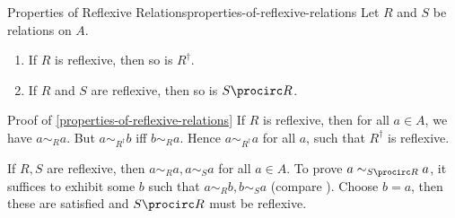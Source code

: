 \begin{proposition}{Properties of Reflexive Relations}{properties-of-reflexive-relations}%
    Let $R$ and $S$ be relations on $A$.
    \begin{enumerate}
        \item\label{properties-of-reflexive-relations-interaction-with-inverses}If $R$ is reflexive, then so is $R^{\dagger}$.
        \item\label{properties-of-reflexive-relations-interaction-with-composition}If $R$ and $S$ are reflexive, then so is $S\procirc R$.
    \end{enumerate}
\end{proposition}
\begin{Proof}{Proof of \cref{properties-of-reflexive-relations}}%
    If $R$ is reflexive, then for all $a \in A$, we have $a \sim_R a$. But $a \sim_{R^\dagger} b$ iff $b \sim_R a$. Hence $a \sim_{R^\dagger} a$ for all $a$, such that $R^\dagger$ is reflexive.

    If $R,S$ are reflexive, then $a \sim_R a, a \sim_S a$ for all $a \in A$.
    To prove $a \sim_{S \procirc R} a$, it suffices to exhibit some $b$ such that $a \sim_R b, b \sim_S a$ (compare ). Choose $b = a$, then these are satisfied and $S \procirc R$ must be reflexive.
\end{Proof}
